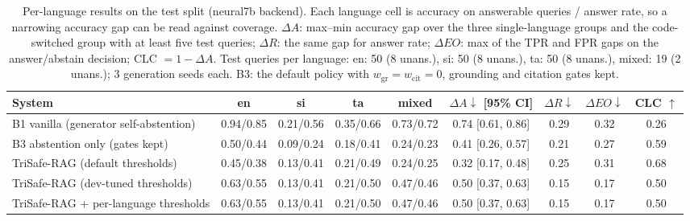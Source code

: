 \begin{table}[t]
  \caption{Per-language results on the test split (neural7b backend). Each language cell is accuracy on answerable queries / answer rate, so a narrowing accuracy gap can be read against coverage. $\Delta A$: max--min accuracy gap over the three single-language groups and the code-switched group with at least five test queries; $\Delta R$: the same gap for answer rate; $\Delta EO$: max of the TPR and FPR gaps on the answer/abstain decision; CLC $= 1-\Delta A$. Test queries per language: en: 50 (8 unans.), si: 50 (8 unans.), ta: 50 (8 unans.), mixed: 19 (2 unans.); 3 generation seeds each. B3: the default policy with $w_{\mathrm{gr}}{=}w_{\mathrm{cit}}{=}0$, grounding and citation gates kept.}
  \label{tab:fair-neural7b}
  \footnotesize
  \setlength{\tabcolsep}{3.5pt}
  \begin{tabular}{lcccccccc}
    \toprule
    System & en & si & ta & mixed & $\Delta A \downarrow$ [95\% CI] & $\Delta R \downarrow$ & $\Delta EO \downarrow$ & CLC $\uparrow$ \\
    \midrule
    B1 vanilla (generator self-abstention) & 0.94/0.85 & 0.21/0.56 & 0.35/0.66 & 0.73/0.72 & 0.74 [0.61, 0.86] & 0.29 & 0.32 & 0.26 \\
    B3 abstention only (gates kept) & 0.50/0.44 & 0.09/0.24 & 0.18/0.41 & 0.24/0.23 & 0.41 [0.26, 0.57] & 0.21 & 0.27 & 0.59 \\
    TriSafe-RAG (default thresholds) & 0.45/0.38 & 0.13/0.41 & 0.21/0.49 & 0.24/0.25 & 0.32 [0.17, 0.48] & 0.25 & 0.31 & 0.68 \\
    TriSafe-RAG (dev-tuned thresholds) & 0.63/0.55 & 0.13/0.41 & 0.21/0.50 & 0.47/0.46 & 0.50 [0.37, 0.63] & 0.15 & 0.17 & 0.50 \\
    TriSafe-RAG + per-language thresholds & 0.63/0.55 & 0.13/0.41 & 0.21/0.50 & 0.47/0.46 & 0.50 [0.37, 0.63] & 0.15 & 0.17 & 0.50 \\
    \bottomrule
  \end{tabular}
\end{table}
